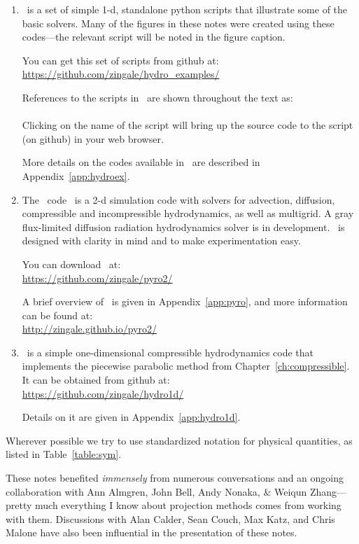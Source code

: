 \begin{enumerate}
\item \hydroex\ is a set of simple 1-d, standalone python scripts
  that illustrate some of the basic solvers.  Many of the figures
  in these notes were created using these codes---the relevant
  script will be noted in the figure caption.  

  You can get this set of scripts from github at:\\
  \url{https://github.com/zingale/hydro_examples/}

  References to the scripts in \hydroex\ are shown throughout
  the text as: \\[0.5em]
   \\[0.5em]
  Clicking on the name of the script will bring up the source code
  to the script (on github) in your web browser.

  More details on the codes available in \hydroex\ are described
  in Appendix~\ref{app:hydroex}.

\item  
  The \pyro\ code~\cite{pyro} is a 2-d simulation code with
  solvers for advection, diffusion, compressible and incompressible
  hydrodynamics, as well as multigrid.  A gray flux-limited diffusion
  radiation hydrodynamics solver is
  in development.  \pyro\ is designed with clarity in mind and to make 
  experimentation easy.  

  You can download \pyro\ at: \\
  \url{https://github.com/zingale/pyro2/} 

  A brief overview of \pyro\ is given in Appendix~\ref{app:pyro},
  and more information can be found at: \\
\url{http://zingale.github.io/pyro2/}

\item \hydrooned\ is a simple one-dimensional compressible
  hydrodynamics code that implements the piecewise parabolic method
  from Chapter~\ref{ch:compressible}.  It can be obtained from
  github at:\\
  \url{https://github.com/zingale/hydro1d/}

  Details on it are given in
  Appendix~\ref{app:hydro1d}.
\end{enumerate}

Wherever possible we try to use standardized notation for physical
quantities, as listed in Table~\ref{table:sym}.

These notes benefited {\em immensely} from numerous conversations and
an ongoing collaboration with Ann Almgren, John Bell, Andy Nonaka, \&
Weiqun Zhang---pretty much everything I know about projection methods
comes from working with them.  Discussions with Alan Calder, Sean
Couch, Max Katz, and Chris Malone have also been influential in the
presentation of these notes.

